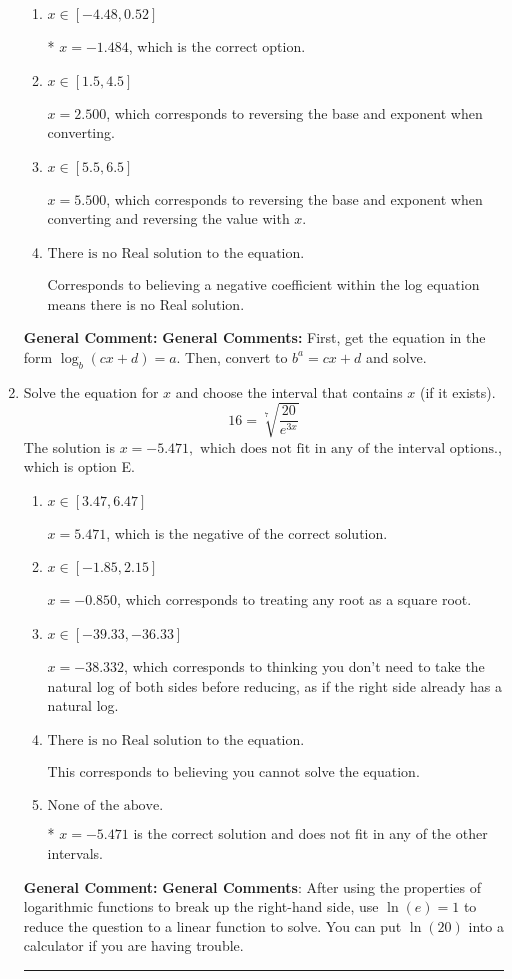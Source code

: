 \documentclass{extbook}[14pt]
\newcommand{\litem}[1]{\item #1

\rule{\textwidth}{0.4pt}}
\begin{document}
\begin{enumerate}
{\begin{enumerate}[label=\Alph*.]
$x = 14.500$, which corresponds to ignoring the vertical shift when converting to exponential form.
\item \( x \in [-4.48, 0.52] \)

* $x = -1.484$, which is the correct option.
\item \( x \in [1.5, 4.5] \)

$x = 2.500$, which corresponds to reversing the base and exponent when converting.
\item \( x \in [5.5, 6.5] \)

$x = 5.500$, which corresponds to reversing the base and exponent when converting and reversing the value with $x$.
\item \( \text{There is no Real solution to the equation.} \)

Corresponds to believing a negative coefficient within the log equation means there is no Real solution.
\end{enumerate}

\textbf{General Comment:} \textbf{General Comments:} First, get the equation in the form $\log_b{(cx+d)} = a$. Then, convert to $b^a = cx+d$ and solve.
}
\litem{
 Solve the equation for $x$ and choose the interval that contains $x$ (if it exists).
\[  16 = \sqrt[7]{\frac{20}{e^{3x}}} \]The solution is \( x = -5.471, \text{ which does not fit in any of the interval options.} \), which is option E.\begin{enumerate}[label=\Alph*.]
\item \( x \in [3.47, 6.47] \)

$x = 5.471$, which is the negative of the correct solution.
\item \( x \in [-1.85, 2.15] \)

$x = -0.850$, which corresponds to treating any root as a square root.
\item \( x \in [-39.33, -36.33] \)

$x = -38.332$, which corresponds to thinking you don't need to take the natural log of both sides before reducing, as if the right side already has a natural log.
\item \( \text{There is no Real solution to the equation.} \)

This corresponds to believing you cannot solve the equation.
\item \( \text{None of the above.} \)

* $x = -5.471$ is the correct solution and does not fit in any of the other intervals.
\end{enumerate}

\textbf{General Comment:} \textbf{General Comments}: After using the properties of logarithmic functions to break up the right-hand side, use $\ln(e) = 1$ to reduce the question to a linear function to solve. You can put $\ln(20)$ into a calculator if you are having trouble.
}
\end{enumerate}
\end{document}
